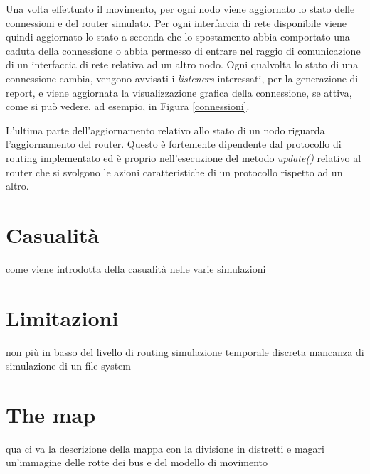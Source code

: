 Una volta effettuato il movimento, per ogni nodo viene aggiornato lo stato delle connessioni e del router simulato. Per ogni interfaccia di rete disponibile viene quindi aggiornato lo stato a seconda che lo spostamento abbia comportato una caduta della connessione o abbia permesso di entrare nel raggio di comunicazione di un interfaccia di rete relativa ad un altro nodo. Ogni qualvolta lo stato di una connessione cambia, vengono avvisati i \textit{listeners} interessati, per la generazione di report, e viene aggiornata la visualizzazione grafica della connessione, se attiva, come si può vedere, ad esempio, in Figura \ref{connessioni}.
\\

L'ultima parte dell'aggiornamento relativo allo stato di un nodo riguarda l'aggiornamento del router. Questo è fortemente dipendente dal protocollo di routing implementato ed è proprio nell'esecuzione del metodo \textit{update()} relativo al router che si svolgono le azioni caratteristiche di un protocollo rispetto ad un altro.

\section{Casualità}
come viene introdotta della casualità nelle varie simulazioni

\section{Limitazioni}
\label{limitazioniONE}
non più in basso del livello di routing
simulazione temporale discreta
mancanza di simulazione di un file system

\section{The map}
\label{mappaONE}
qua ci va la descrizione della mappa con la divisione in distretti e magari un'immagine delle rotte dei bus e del modello di movimento

